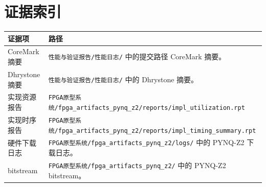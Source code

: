 \documentclass[UTF8,a4paper,12pt,fontset=windows]{ctexart}
\newcommand{\Code}[1]{\texttt{#1}}
\begin{document}
\clearpage
\section*{证据索引}

\begin{tabularx}{\textwidth}{L{4.3cm}Y}
\toprule
{}
证据项 & 路径 \\
\midrule
CoreMark 摘要 & \Code{性能与验证报告/性能日志/} 中的提交路径 CoreMark 摘要。 \\
Dhrystone 摘要 & \Code{性能与验证报告/性能日志/} 中的 Dhrystone 摘要。 \\
实现资源报告 & \Code{FPGA原型系统/fpga\_artifacts\_pynq\_z2/reports/impl\_utilization.rpt} \\
实现时序报告 & \Code{FPGA原型系统/fpga\_artifacts\_pynq\_z2/reports/impl\_timing\_summary.rpt} \\
硬件下载日志 & \Code{FPGA原型系统/fpga\_artifacts\_pynq\_z2/logs/} 中的 PYNQ-Z2 下载日志。 \\
bitstream & \Code{FPGA原型系统/fpga\_artifacts\_pynq\_z2/} 中的 PYNQ-Z2 bitstream。 \\
\bottomrule
\end{tabularx}
\end{document}
